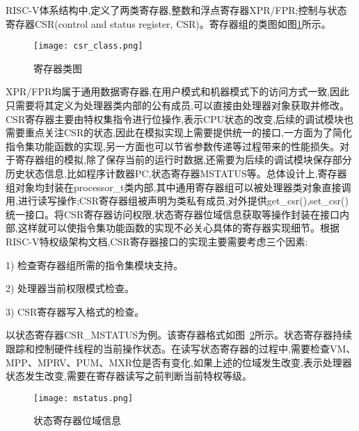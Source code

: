 RISC-V体系结构中,定义了两类寄存器,整数和浮点寄存器XPR/FPR;控制与状态寄存器CSR(control and status register, CSR)。寄存器组的类图如图\ref{fig:csr_class}所示。
\begin{figure}[H]
    \centering
    \texttt{[image: csr\_class.png]}
    \caption{寄存器类图}
    \label{fig:csr_class}
\end{figure}


XPR/FPR均属于通用数据寄存器,在用户模式和机器模式下的访问方式一致,因此只需要将其定义为处理器类内部的公有成员,可以直接由处理器对象获取并修改。CSR寄存器主要由特权集指令进行位操作,表示CPU状态的改变,后续的调试模块也需要重点关注CSR的状态,因此在模拟实现上需要提供统一的接口,一方面为了简化指令集功能函数的实现,另一方面也可以节省参数传递等过程带来的性能损失。对于寄存器组的模拟,除了保存当前的运行时数据,还需要为后续的调试模块保存部分历史状态信息,比如程序计数器PC,状态寄存器MSTATUS等。总体设计上,寄存器组对象均封装在processor\_t类内部,其中通用寄存器组可以被处理器类对象直接调用,进行读写操作;CSR寄存器组被声明为类私有成员,对外提供get\_csr(),set\_csr()统一接口。将CSR寄存器访问权限,状态寄存器位域信息获取等操作封装在接口内部,这样就可以使指令集功能函数的实现不必关心具体的寄存器实现细节。根据RISC-V特权级架构文档,CSR寄存器接口的实现主要需要考虑三个因素:


1) 检查寄存器组所需的指令集模块支持。


2) 处理器当前权限模式检查。


3) CSR寄存器写入格式的检查。


以状态寄存器CSR\_MSTATUS为例。该寄存器格式如图~\ref{fig:mstatus}所示。状态寄存器持续跟踪和控制硬件线程的当前操作状态。在读写状态寄存器的过程中,需要检查VM、MPP、MPRV、PUM、MXR位是否有变化,如果上述的位域发生改变,表示处理器状态发生改变,需要在寄存器读写之前判断当前特权等级。
\begin{figure}[H]
    \centering
    \texttt{[image: mstatus.png]}
    \caption{状态寄存器位域信息}
    \label{fig:mstatus}
\end{figure}


